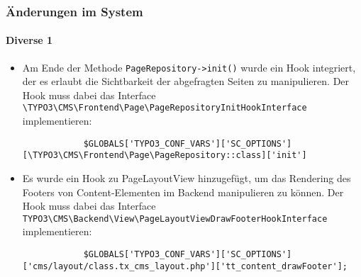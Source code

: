 \begin{frame}[fragile]
	\frametitle{Änderungen im System}
	\framesubtitle{Diverse 1}

	\lstset{
		basicstyle=\tiny\ttfamily
	}

	\begin{itemize}
		\item Am Ende der Methode \texttt{PageRepository->init()} wurde ein Hook integriert, der es erlaubt die Sichtbarkeit der abgefragten Seiten zu manipulieren. Der Hook muss dabei das Interface \lstinline{\TYPO3\CMS\Frontend\Page\PageRepositoryInitHookInterface} implementieren:
		\begin{lstlisting}
			$GLOBALS['TYPO3_CONF_VARS']['SC_OPTIONS'][\TYPO3\CMS\Frontend\Page\PageRepository::class]['init']
		\end{lstlisting}
		\item Es wurde ein Hook zu PageLayoutView hinzugefügt, um das Rendering des Footers von Content-Elementen im Backend manipulieren zu können. Der Hook muss dabei das Interface \lstinline{TYPO3\CMS\Backend\View\PageLayoutViewDrawFooterHookInterface} implementieren:
		\begin{lstlisting} 
			$GLOBALS['TYPO3_CONF_VARS']['SC_OPTIONS']['cms/layout/class.tx_cms_layout.php']['tt_content_drawFooter'];
		\end{lstlisting}
	\end{itemize}

\end{frame}


